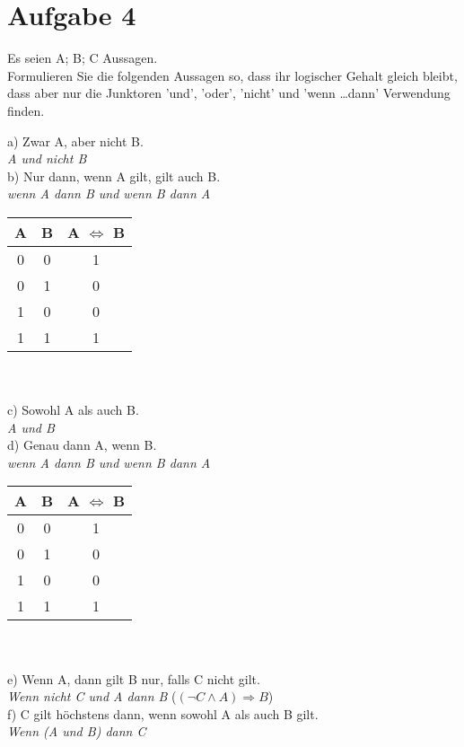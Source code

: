 \section*{Aufgabe 4}

Es seien A; B; C Aussagen.\\

Formulieren Sie die folgenden Aussagen so, dass ihr logischer Gehalt gleich bleibt, dass aber nur die Junktoren 'und', 'oder', 'nicht' und 'wenn \dots dann' Verwendung finden.

a) Zwar A, aber nicht B.\\

\textit{A und nicht B}\\

b) Nur dann, wenn A gilt, gilt auch B.\\

\textit{wenn A dann B und wenn B dann A}\\

\begin{tabular}{c|c|c}
A & B & A $\Leftrightarrow$ B\\
\hline
0 & 0 & 1\\
0 & 1 & 0\\
1 & 0 & 0\\
1 & 1 & 1\\
\end{tabular}\\~\\

c) Sowohl A als auch B.\\

\textit{A und B}\\

d) Genau dann A, wenn B.\\

\textit{wenn A dann B und wenn B dann A}\\

\begin{tabular}{c|c|c}
A & B & A $\Leftrightarrow$ B\\
\hline
0 & 0 & 1\\
0 & 1 & 0\\
1 & 0 & 0\\
1 & 1 & 1\\
\end{tabular}\\~\\

e) Wenn A, dann gilt B nur, falls C nicht gilt.\\

\textit{Wenn nicht C und A  dann B} ($(\lnot C \land A) \Rightarrow B$)\\

f) C gilt höchstens dann, wenn sowohl A als auch B gilt.\\

\textit{Wenn (A und B) dann C}\\